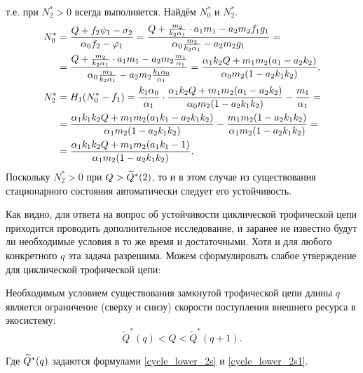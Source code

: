 \begin{enumerate}
т.е. при \(N^*_2 > 0\) всегда выполняется. Найдём \(N^*_0\) и \( N^*_2\). 
\begin{equation*}
    \begin{split}
        N^*_0 &= \frac{Q + f_2 \psi_1 - \sigma_2}{\alpha_0 f_2 - \varphi_1} = \frac{Q + \frac{m_2}{k_2 \alpha_1} \cdot a_1 m_1 - a_2 m_2 f_1 g_1}{\alpha_0 \frac{m_2}{k_2 \alpha_1} - a_2 m_2 g_1} =\\
        & = \frac{Q + \frac{m_2}{k_2 \alpha_1} \cdot a_1 m_1 - a_2 m_2 \frac{m_1}{\alpha_1}}{\alpha_0 \frac{m_2}{k_2 \alpha_1} - a_2 m_2 \frac{k_1 \alpha_0}{\alpha_1}} = 
        \frac{\alpha_1 k_2 Q +  m_1 m_2 ( a_1- a_2 k_2 )}{\alpha_0 m_2 ( 1- a_2 k_1 k_2 ) }, \\
        N^*_2 &= H_1 (N^*_0 - f_1) = \frac{k_1 \alpha_0}{\alpha_1} \cdot \frac{\alpha_1 k_2 Q +  m_1 m_2 ( a_1- a_2 k_2 )}{\alpha_0 m_2 ( 1 - a_2 k_1 k_2 ) } - \frac{m_1}{\alpha_1} =\\
        & = \frac{\alpha_1 k_1 k_2 Q + m_1 m_2 ( a_1 k_1 - a_2 k_1 k_2 )}{\alpha_1 m_2 ( 1- a_2 k_1 k_2 ) } - \frac{m_1 m_2 ( 1- a_2 k_1 k_2 )}{\alpha_1 m_2 ( 1- a_2 k_1 k_2 )} = \\
        & = \frac{\alpha_1 k_1 k_2 Q + m_1 m_2 ( a_1 k_1 - 1 )}{\alpha_1 m_2 ( 1- a_2 k_1 k_2 ) }.
    \end{split}
\end{equation*}
Поскольку \( N^*_2 > 0 \) при \( Q > \widetilde{Q}^*(2)\), то и в этом случае из существования стационарного состояния автоматически следует его устойчивость.
\end{enumerate}

Как видно, для ответа на вопрос об устойчивости циклической трофической цепи приходится проводить дополнительное исследование, и заранее не известно будут ли необходимые условия в то же время и достаточными. Хотя и для любого конкретного \(q\) эта задача разрешима. Можем сформулировать слабое утверждение для циклической трофической цепи:
\begin{corollary}
    Необходимым условием существования замкнутой трофической цепи длины \(q\) является ограничение (сверху и снизу) скорости поступления внешнего ресурса в экосистему:
    \begin{equation}
        \widetilde{Q}^*(q) < Q < \widetilde{Q}^*(q+1).
    \end{equation}
\end{corollary}
Где \(\widetilde{Q}^*(q)\) задаются формулами \eqref{cycle_lower_2s} и \eqref{cycle_lower_2s1}.

